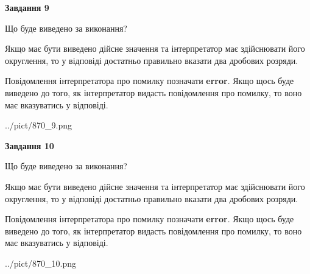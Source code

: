 \documentclass[12pt, ukrainian]{article}
\begin{document}
{\begin {Large}
{\begin {center}\textbf{Завдання 9}\end {center}}\par
Що буде виведено за виконання? \par

Якщо має бути виведено дійсне значення та інтерпретатор має здійснювати його округлення, 
то у відповіді достатньо правильно вказати два дробових розряди.

Повідомлення інтерпретатора про помилку позначати \textbf{error}.
Якщо щось буде виведено до того, як інтерпретатор видасть повідомлення про помилку, 
то воно має вказуватись у відповіді. \par

\begin{center}
	{../pict/870_9.png}
\end{center}
\newpage

{\begin {center}\textbf{Завдання 10}\end {center}}\par
Що буде виведено за виконання? \par

Якщо має бути виведено дійсне значення та інтерпретатор має здійснювати його округлення, 
то у відповіді достатньо правильно вказати два дробових розряди.

Повідомлення інтерпретатора про помилку позначати \textbf{error}.
Якщо щось буде виведено до того, як інтерпретатор видасть повідомлення про помилку, 
то воно має вказуватись у відповіді. \par

\begin{center}
	{../pict/870_10.png}
\end{center}
\newpage

\end {Large}}
\end{document}
